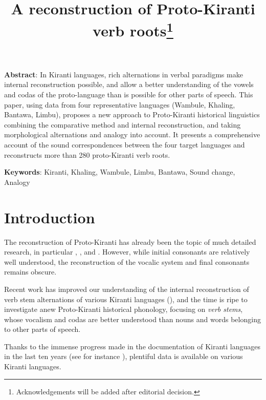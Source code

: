 \documentclass[oldfontcommands,oneside,a4paper,11pt]{article}
\begin{document}
\title{A reconstruction of Proto-Kiranti verb roots\footnote{Acknowledgements will be added after editorial decision.}} %
\maketitle
\sloppy

\textbf{Abstract}: In Kiranti languages, rich alternations in verbal paradigms make internal reconstruction possible, and allow a better understanding of the vowels and codas of the proto-language than is possible for other parts of speech. This paper, using data from four representative languages (Wambule, Khaling, Bantawa, Limbu), proposes a new approach to Proto-Kiranti historical linguistics combining the comparative method and internal reconstruction, and taking morphological alternations and analogy into account. It presents a comprehensive account of the sound correspondences between the four target languages and reconstructs more than 280 proto-Kiranti verb roots.

\textbf{Keywords}: Kiranti, Khaling, Wambule, Limbu, Bantawa, Sound change, Analogy

\section{Introduction}
The reconstruction of Proto-Kiranti has already been the topic of much detailed research, in particular \citet{starostin94kiranti}, \citet{michailovsky94stops}, \citet{opgenort05jero} and \citet{michailovsky10kiranti}. However, while  initial consonants are relatively well understood, the reconstruction of the vocalic system and final consonants remains obscure.  

Recent work has improved our understanding of the internal reconstruction of verb stem alternations of various Kiranti languages (\citealt{michailovsky02dico, lahaussois11thulung, jacques12khaling, michailovsky12dumi}), and the time is ripe to investigate anew Proto-Kiranti historical phonology, focusing on \textit{verb stems}, whose vocalism and codas are better understood than nouns and words belonging to other parts of speech.

Thanks to the immense progress made in the documentation of Kiranti languages in the last ten years (see for instance \citealt{bickel07chintang, bickel07puma, schackow08puma, doornenbal09, lahaussois09, huysmans2011sampang, schackow15yakkha}), plentiful data is available on various Kiranti languages. 
\end{document}
